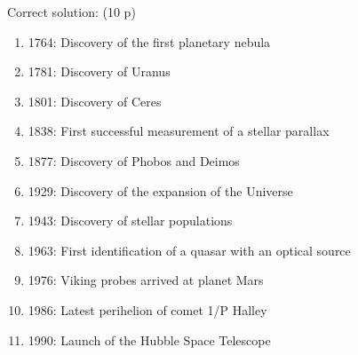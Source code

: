 Correct solution: \hfill(10 p)

\begin{enumerate}
\item 1764: Discovery of the first planetary nebula
\item 1781: Discovery of Uranus
\item 1801: Discovery of Ceres
\item 1838: First successful measurement of a stellar parallax
\item 1877: Discovery of Phobos and Deimos
\item 1929: Discovery of the expansion of the Universe
\item 1943: Discovery of stellar populations
\item 1963: First identification of a quasar with an optical source
\item 1976: Viking probes arrived at planet Mars
\item 1986: Latest perihelion of comet 1/P Halley
\item 1990: Launch of the Hubble Space Telescope
\end{enumerate}
